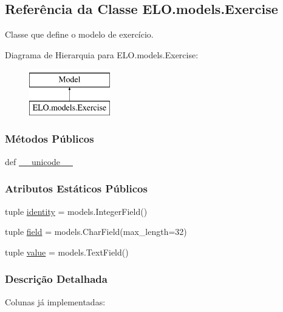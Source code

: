 \hypertarget{classELO_1_1models_1_1Exercise}{\subsection{Referência da Classe E\-L\-O.\-models.\-Exercise}
\label{classELO_1_1models_1_1Exercise}
}


Classe que define o modelo de exercício.  


Diagrama de Hierarquia para E\-L\-O.\-models.\-Exercise\-:\begin{figure}[H]
\begin{center}
\leavevmode
\includegraphics[height=2.000000cm]{d3/da8/classELO_1_1models_1_1Exercise}
\end{center}
\end{figure}
\subsubsection*{Métodos Públicos}
\begin{DoxyCompactItemize}
\item 
def \hyperlink{classELO_1_1models_1_1Exercise_af3e991e5610cec815a2c3260ec6aae0b}{\-\_\-\-\_\-unicode\-\_\-\-\_\-}
\end{DoxyCompactItemize}
\subsubsection*{Atributos Estáticos Públicos}
\begin{DoxyCompactItemize}
\item 
tuple \hyperlink{classELO_1_1models_1_1Exercise_a0b63268e129a279de260ad21060a1b55}{identity} = models.\-Integer\-Field()
\item 
tuple \hyperlink{classELO_1_1models_1_1Exercise_a4567f8aa62747a0eabb1c89ab18ec1ce}{field} = models.\-Char\-Field(max\-\_\-length=32)
\item 
tuple \hyperlink{classELO_1_1models_1_1Exercise_ae4d0d7ecfe0004385c031cbba76f3b4d}{value} = models.\-Text\-Field()
\end{DoxyCompactItemize}


\subsubsection{Descrição Detalhada}
Colunas já implementadas\-:

